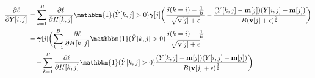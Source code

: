 \documentclass{article}
\begin{document}
{\begin{equation}
\end{equation}
\begin{equation}
\begin{aligned}
    \frac{\partial \ell}{\partial Y[i,j]}&= \sum_{k=1}^{B} \frac{\partial \ell}{\partial H[k,j]} \mathbbm{1}(\hat{Y}[k,j]>0) \boldsymbol{\gamma}[j] 
    \biggl( \frac{\delta(k=i)- \frac{1}{B}}{\sqrt{\textbf{v}[j]+ \epsilon}}- \frac{(Y[k,j]- \textbf{m}[j])(Y[i,j]- \textbf{m}[j])}{B(\textbf{v}[j]+ \epsilon)^{\frac{3}{2}}} \biggr)\\
    &= \boldsymbol{\gamma}[j] 
    \biggl( \sum_{k=1}^{B} \frac{\partial \ell}{\partial H[k,j]} \mathbbm{1}(\hat{Y}[k,j]>0) \frac{\delta(k=i)- \frac{1}{B}}{\sqrt{\textbf{v}[j]+ \epsilon}} \\
    &\quad - \sum_{k=1}^{B} \frac{\partial \ell}{\partial H[k,j]} \mathbbm{1}(\hat{Y}[k,j]>0) 
    \frac{(Y[k,j]- \textbf{m}[j])(Y[i,j]- \textbf{m}[j])}{B(\textbf{v}[j]+ \epsilon)^{\frac{3}{2}}} \biggr)
\end{aligned}
\end{equation}

}
\end{document}
